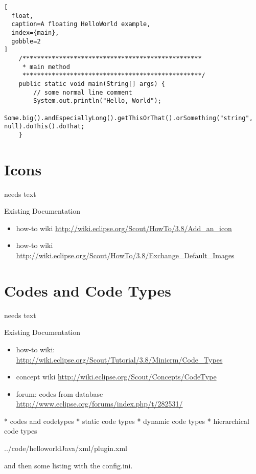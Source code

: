 \documentclass[a4paper,10pt,twoside]{book}
\begin{document}
\begin{lstlisting}[
  float,
  caption=A floating HelloWorld example,
  index={main},
  gobble=2
]
    /*************************************************
     * main method
     *************************************************/
    public static void main(String[] args) {
        // some normal line comment
        System.out.println("Hello, World");
        Some.big().andEspeciallyLong().getThisOrThat().orSomething("string", null).doThis().doThat;
    }
\end{lstlisting}

\section{Icons}
needs text

\noindent Existing Documentation
\begin{itemize}
  \item how-to wiki \url{http://wiki.eclipse.org/Scout/HowTo/3.8/Add_an_icon}
  \item how-to wiki \url{http://wiki.eclipse.org/Scout/HowTo/3.8/Exchange_Default_Images}
\end{itemize}

\section{Codes and Code Types}
needs text

\noindent Existing Documentation
\begin{itemize}
  \item how-to wiki: \url{http://wiki.eclipse.org/Scout/Tutorial/3.8/Minicrm/Code_Types}
  \item concept wiki \url{http://wiki.eclipse.org/Scout/Concepts/CodeType}
  \item forum: codes from database \url{http://www.eclipse.org/forums/index.php/t/282531/}
\end{itemize}

  * codes and codetypes
  * static code types
  * dynamic code types
  * hierarchical code types

  
  

{../code/helloworldJava/xml/plugin.xml}

and then some listing with the config.ini.
\end{document}

